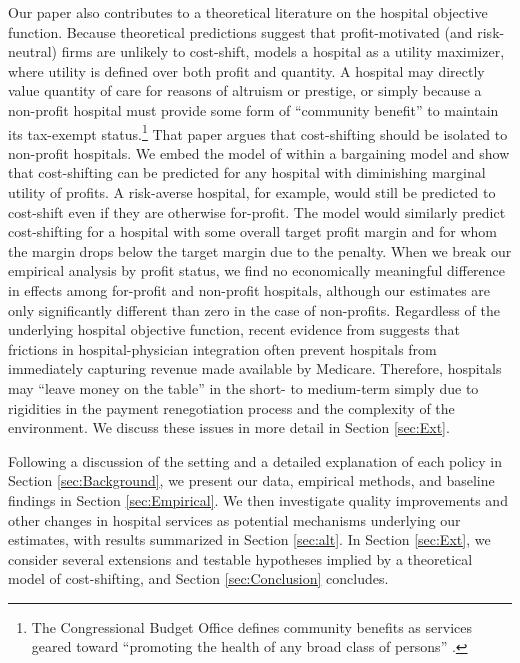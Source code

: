 \documentclass[12pt]{article}
\begin{document}
Our paper also contributes to a theoretical literature on the hospital objective function. Because theoretical predictions suggest that profit-motivated (and risk-neutral) firms are unlikely to cost-shift, \cite{dranove1988} models a hospital as a utility maximizer, where utility is defined over both profit and quantity.  A hospital may directly value quantity of care for reasons of altruism or prestige, or simply because a non-profit hospital must provide some form of ``community benefit'' to maintain its tax-exempt status.\footnote{The Congressional Budget Office defines community benefits as services geared toward ``promoting the health of any broad class of persons'' \citep{cbo2006}.}  That paper argues that cost-shifting should be isolated to non-profit hospitals. We embed the model of \cite{dranove1988} within a bargaining model \citep{ho2017} and show that cost-shifting can be predicted for any hospital with diminishing marginal utility of profits. A risk-averse hospital, for example, would still be predicted to cost-shift even if they are otherwise for-profit. The model would similarly predict cost-shifting for a hospital with some overall target profit margin and for whom the margin drops below the target margin due to the penalty. When we break our empirical analysis by profit status, we find no economically meaningful difference in effects among for-profit and non-profit hospitals, although our estimates are only significantly different than zero in the case of non-profits.  Regardless of the underlying hospital objective function, recent evidence from \citet{sacarny2018} suggests that frictions in hospital-physician integration often prevent hospitals from immediately capturing revenue made available by Medicare. Therefore, hospitals may ``leave money on the table'' in the short- to medium-term simply due to rigidities in the payment renegotiation process and the complexity of the environment. We discuss these issues in more detail in Section \ref{sec:Ext}.

Following a discussion of the setting and a detailed explanation of each policy in Section \ref{sec:Background}, we present our data, empirical methods, and baseline findings in Section \ref{sec:Empirical}. We then investigate quality improvements and other changes in hospital services as potential mechanisms underlying our estimates, with results summarized in Section \ref{sec:alt}. In Section \ref{sec:Ext}, we consider several extensions and testable hypotheses implied by a theoretical model of cost-shifting, and Section \ref{sec:Conclusion} concludes.
\end{document}
